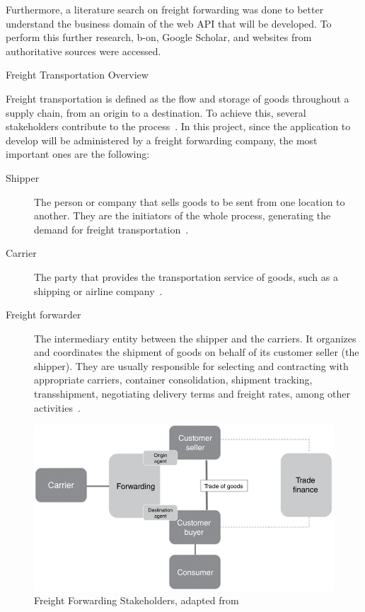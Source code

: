 \documentclass[12pt, reqno]{amsbook}
\makeatletter
\def\section{\@startsection{section}{1}%
      \z@{.5\linespacing\@plus.7\linespacing}{.25\linespacing}%
      {\normalfont\bfseries\flushleft}}
\theoremstyle{definition}
\theoremstyle{definition}
\numberwithin{section}{chapter}
\numberwithin{table}{chapter}
\numberwithin{figure}{chapter}
\makeatother
\begin{document}
Furthermore, a literature search on freight forwarding was done to better understand the business domain of the web API that will be developed. To perform this further research, b-on, Google Scholar, and websites from authoritative sources were accessed.

\section{Freight Transportation Overview}
\label{Section:Freight_Transportation_Overview}

Freight transportation is defined as the flow and storage of goods throughout a supply chain, from an origin to a destination. To achieve this, several stakeholders contribute to the process~\cite{Song2021, Huber2021}. In this project, since the application to develop will be administered by a freight forwarding company, the most important ones are the following:

\begin{description}
  \item [Shipper] The person or company that sells goods to be sent from one location to another. They are the initiators of the whole process, generating the demand for freight transportation~\cite{Song2021}.
  \item [Carrier] The party that provides the transportation service of goods, such as a shipping or airline company~\cite{Song2021}.
  \item [Freight forwarder] The intermediary entity between the shipper and the carriers. It organizes and coordinates the shipment of goods on behalf of its customer seller (the shipper). They are usually responsible for selecting and contracting with appropriate carriers, container consolidation, shipment tracking, transshipment, negotiating delivery terms and freight rates, among other activities~\cite{Song2021, Huang2019}.
\end{description}

\begin{figure}[H]
  \centering
  \includegraphics[width=0.9\linewidth]{images/FreightForwarding.png}
  \caption{\label{Figure:FreightForwarding}Freight Forwarding Stakeholders, adapted from~\cite{Peffers2007}}
\end{figure}
\end{document}
